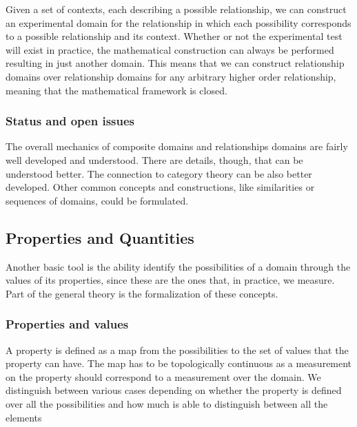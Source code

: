 \documentclass[twocolumn]{article}
\newif\ifextended
\newcommand\fact[2]{\ifextended \emph{#1}. #2 \fi}
\begin{document}
Given a set of contexts, each describing a possible relationship, we can construct an experimental domain for the relationship in which each possibility corresponds to a possible relationship and its context. Whether or not the experimental test will exist in practice, the mathematical construction can always be performed resulting in just another domain. This means that we can construct relationship domains over relationship domains for any arbitrary higher order relationship, meaning that the mathematical framework is closed.

\fact{Tests for the relationship domain} {The experimental verifiability of relationship domain statements cannot be proven from the verifiability of each domain. This formalizes the problem that being able to measure a single point (i.e. the temperature and height in a particular circumstance) is not enough to verify the relationship (i.e. the temperature and height are always linked in a particular way). The ability to experimentally explore the space is what builds confidence, which may not be always possible. What constitutes enough evidence is left, as before, outside of the formalism.}


\subsubsection{Status and open issues}

The overall mechanics of composite domains and relationships domains are fairly well developed and understood. There are details, though, that can be understood better. The connection to category theory can be also better developed. Other common concepts and constructions, like similarities or sequences of domains, could be formulated.

\subsection{Properties and Quantities}

Another basic tool is the ability identify the possibilities of a domain through the values of its properties, since these are the ones that, in practice, we measure. Part of the general theory is the formalization of these concepts.

\subsubsection{Properties and values}

A property is defined as a map from the possibilities to the set of values that the property can have. The map has to be topologically continuous as a measurement on the property should correspond to a measurement over the domain. We distinguish between various cases depending on whether the property is defined over all the possibilities and how much is able to distinguish between all the elements
\end{document}
